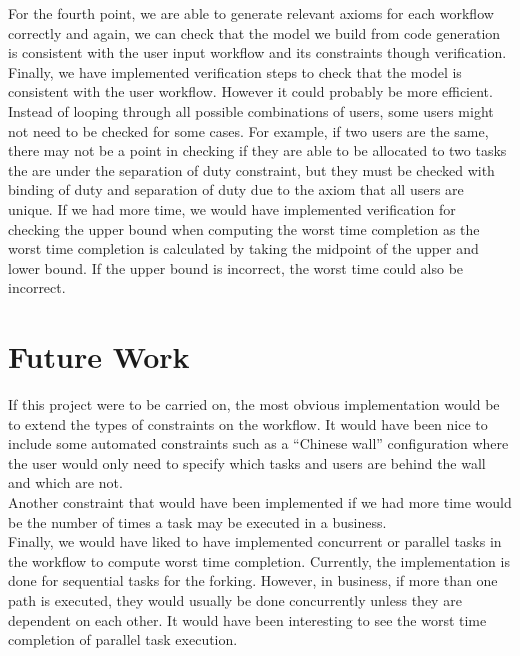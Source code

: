 \documentclass[a4paper]{report}
\begin{document}
For the fourth point, we are able to generate relevant axioms for each workflow correctly and again, we can check that the model we build from code generation is consistent with the user input workflow and its constraints though verification.\\

Finally, we have implemented verification steps to check that the model is consistent with the user workflow. However it could probably be more efficient. Instead of looping through all possible combinations of users, some users might not need to be checked for some cases. For example, if two users are the same, there may not be a point in checking if they are able to be allocated to two tasks the are under the separation of duty constraint, but they must be checked with binding of duty and separation of duty due to the axiom that all users are unique. If we had more time, we would have implemented verification for checking the upper bound when computing the worst time completion as the worst time completion is calculated by taking the midpoint of the upper and lower bound. If the upper bound is incorrect, the worst time could also be incorrect. \\

\section{Future Work}
If this project were to be carried on, the most obvious implementation would be to extend the types of constraints on the workflow. It would have been nice to include some automated constraints such as a ``Chinese wall'' configuration where the user would only need to specify which tasks and users are behind the wall and which are not. \\

Another constraint that would have been implemented if we had more time would be the number of times a task may be executed in a business. \\

Finally, we would have liked to have implemented concurrent or parallel tasks in the workflow to compute worst time completion. Currently, the implementation is done for sequential tasks for the forking. However, in business, if more than one path is executed, they would usually be done concurrently unless they are dependent on each other. It would have been interesting to see the worst time completion of parallel task execution. \\
\end{document}
